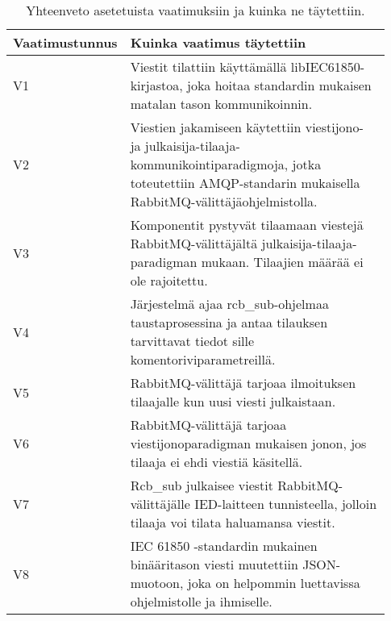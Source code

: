 \begin{table}[ht!]
	\caption{Yhteenveto asetetuista vaatimuksiin ja kuinka ne täytettiin.}
	\label{tab:requirements-met}
	\begin{tabular}{p{0.11\linewidth} | p{0.82\linewidth}}
		\hline
		\textbf{Vaatimus\-tunnus} & \textbf{Kuinka vaatimus täytettiin} \\
		\hline
		V1 & Viestit tilattiin käyttämällä libIEC61850-kirjastoa, joka hoitaa standardin mukaisen matalan tason kommunikoinnin. \\
		\hline
		V2 & Viestien jakamiseen käytettiin viestijono- ja julkaisija-tilaaja-kommunikointiparadigmoja, jotka toteutettiin AMQP-standarin mukaisella RabbitMQ-välittäjäohjelmistolla. \\
		\hline
		V3 & Komponentit pystyvät tilaamaan viestejä RabbitMQ-välittäjältä julkaisija-tilaaja-paradigman mukaan. Tilaajien määrää ei ole rajoitettu. \\
		\hline
		V4 & Järjestelmä ajaa rcb\_sub-ohjelmaa taustaprosessina ja antaa tilauksen tarvittavat tiedot sille komentoriviparametreillä. \\
		\hline
		V5 & RabbitMQ-välittäjä tarjoaa ilmoituksen tilaajalle kun uusi viesti julkaistaan. \\
		\hline
		V6 & RabbitMQ-välittäjä tarjoaa viestijonoparadigman mukaisen jonon, jos tilaaja ei ehdi viestiä käsitellä. \\
		\hline
		V7 & Rcb\_sub julkaisee viestit RabbitMQ-välittäjälle IED-laitteen tunnisteella, jolloin tilaaja voi tilata haluamansa viestit. \\
		\hline
		V8 & IEC 61850 -standardin mukainen binääritason viesti muutettiin JSON-muotoon, joka on helpommin luettavissa ohjelmistolle ja ihmiselle. \\
		\hline

\end{tabular}
\end{table}
